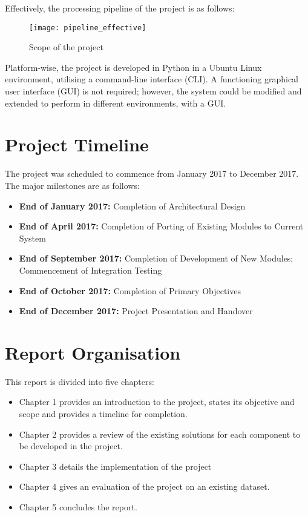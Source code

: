 Effectively, the processing pipeline of the project is as follows:

\begin{figure}[h]
\begin{center}
    \texttt{[image: pipeline\_effective]}
    \caption{Scope of the project}
\end{center}
\end{figure}
    
Platform-wise, the project is developed in Python in a Ubuntu Linux environment,
utilising a command-line interface (CLI). A functioning graphical user interface
(GUI) is not required; however, the system could
be modified and extended to perform in different environments, with a GUI\@.

\section{Project Timeline}

The project was scheduled to commence from January 2017 to December 2017. The major
milestones are as follows:

\begin{itemize}
    \item \textbf{End of January 2017:} Completion of Architectural Design
    \item \textbf{End of April 2017:} Completion of Porting of Existing Modules
    to Current System
    \item \textbf{End of September 2017:} Completion of Development of New Modules;
    Commencement of Integration Testing
    \item \textbf{End of October 2017:} Completion of Primary Objectives
    \item \textbf{End of December 2017:} Project Presentation and Handover
\end{itemize}

\section{Report Organisation}

This report is divided into five chapters:

\begin{itemize}
    \item Chapter 1 provides an introduction to the project, states its objective
    and scope and provides a timeline for completion.
    \item Chapter 2 provides a review of the existing solutions for each component
    to be developed in the project.
    \item Chapter 3 details the implementation of the project
    \item Chapter 4 gives an evaluation of the project on an existing dataset.
    \item Chapter 5 concludes the report.
\end{itemize}